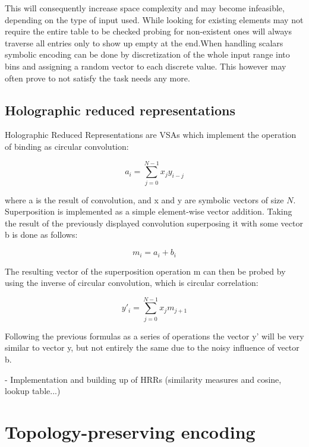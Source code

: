 \documentclass[conference]{IEEEtran}
\begin{document}
	This will consequently increase space complexity and may become infeasible, depending on the type of input used. While looking for existing elements may not require the entire table to be checked probing for non-existent ones will always traverse all entries only to show up empty at the end.When handling scalars symbolic encoding can be done by discretization of the whole input range into bins and assigning a random vector to each discrete value. This however may often prove to not satisfy the task needs any more.
	
	\subsection{Holographic reduced representations}
	\label{sec:hrr}
	
	Holographic Reduced Representations are VSAs which implement the operation of binding as circular convolution:
	
	\begin{equation}
	a_i=\sum_{j=0}^{N-1}{x_j y_{i-j}} 
	\end{equation}
	
	where \pmb a is the result of convolution, and \pmb x and \pmb y are symbolic vectors of size $N$.
Superposition is implemented as a simple element-wise vector addition. Taking the result of the previously displayed convolution superposing it with some vector \pmb b is done as follows:

	\begin{equation}
	m_i = a_i + b_i
	\end{equation}

The resulting vector of the superposition operation \pmb m can then be probed by using the inverse of circular convolution, which is circular correlation:
	
	\begin{equation}
	y'_i=\sum_{j=0}^{N-1}{x_jm_{j+1}} 
	\end{equation} 

Following the previous formulas as a series of operations the vector \pmb y' will be very similar to vector \pmb y, but not entirely the same due to the noisy influence of vector \pmb b.
		
	- Implementation and building up of HRRs (similarity measures and cosine, lookup table...)
	
	
	\section{Topology-preserving encoding}
	
\end{document}

